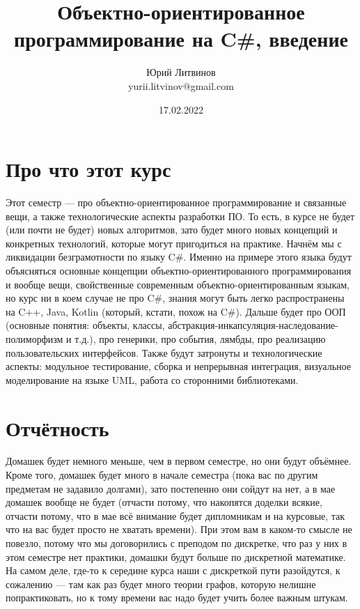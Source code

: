 \documentclass[a5paper]{article}
\title{Объектно-ориентированное программирование на C\#, введение}
\author{Юрий Литвинов\\\small{yurii.litvinov@gmail.com}}
\date{17.02.2022}
\begin{document}
\maketitle
\thispagestyle{empty}

\section{Про что этот курс}

Этот семестр --- про объектно-ориентированное программирование и связанные вещи, а также технологические аспекты разработки ПО. То есть, в курсе не будет (или почти не будет) новых алгоритмов, зато будет много новых концепций и конкретных технологий, которые могут пригодиться на практике. Начнём мы с ликвидации безграмотности по языку C\#. Именно на примере этого языка будут объясняться основные концепции объектно-ориентированного программирования и вообще вещи, свойственные современным объектно-ориентированным языкам, но курс ни в коем случае не про C\#, знания могут быть легко распространены на C++, Java, Kotlin (который, кстати, похож на C\#). Дальше будет про ООП (основные понятия: объекты, классы, абстракция-инкапсуляция-наследование-полиморфизм и т.д.), про генерики, про события, лямбды, про реализацию пользовательских интерфейсов. Также будут затронуты и технологические аспекты: модульное тестирование, сборка и непрерывная интеграция, визуальное моделирование на языке UML, работа со сторонними библиотеками.

\section{Отчётность}

Домашек будет немного меньше, чем в первом семестре, но они будут объёмнее. Кроме того, домашек будет много в начале семестра (пока вас по другим предметам не задавило долгами), зато постепенно они сойдут на нет, а в мае домашек вообще не будет (отчасти потому, что накопятся доделки всякие, отчасти потому, что в мае всё внимание будет дипломникам и на курсовые, так что на вас будет просто не хватать времени). При этом вам в каком-то смысле не повезло, потому что мы договорились с преподом по дискретке, что раз у них в этом семестре нет практики, домашки будут больше по дискретной математике. На самом деле, где-то к середине курса наши с дискреткой пути разойдутся, к сожалению --- там как раз будет много теории графов, которую нелишне попрактиковать, но к тому времени вас надо будет учить более важным штукам.
\end{document}
